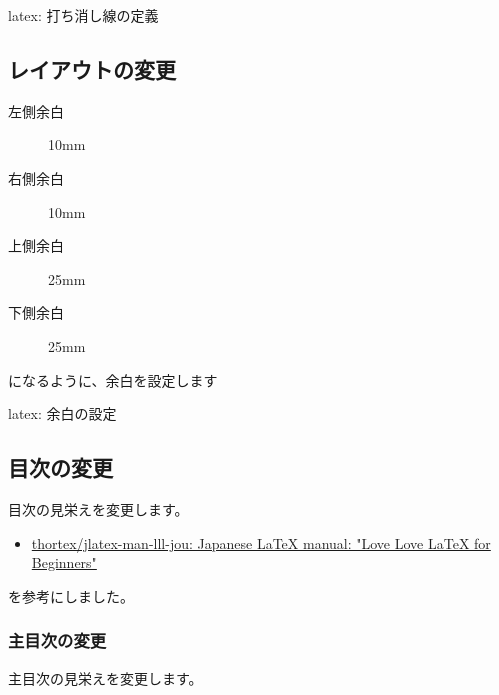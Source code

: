 \documentclass[dvipdfmx,a4j,14pt,uplatex]{jsarticle}
\begin{document}
\begin{programlist}[label={org013f459}]{latex}{: 打ち消し線の定義}\newcommand{\sout}[1]{\mline{#1}}
\end{programlist}



\subsection{レイアウトの変更}
\label{sec:orgc07b4c4}
\begin{description}
\item[{左側余白}] 10mm
\item[{右側余白}] 10mm
\item[{上側余白}] 25mm
\item[{下側余白}] 25mm
\end{description}

になるように、余白を設定します


\begin{programlist}[label={org5725cd3}]{latex}{: 余白の設定}\usepackage[top=25truemm,bottom=25truemm,inner=10truemm,outer=10truemm]{geometry}
\end{programlist}
\subsection{目次の変更}
\label{sec:orga279aa8}
目次の見栄えを変更します。

\begin{itemize}
\item \href{https://github.com/thortex/jlatex-man-lll-jou}{thortex/jlatex-man-lll-jou: Japanese \LaTeX{} manual: "Love Love \LaTeX{} for Beginners"}
\end{itemize}


を参考にしました。

\subsubsection{主目次の変更}
\label{sec:org9a505d3}
主目次の見栄えを変更します。
\end{document}

